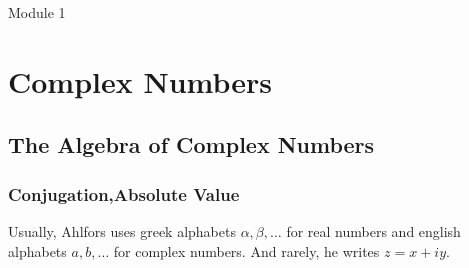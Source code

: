 

{\Large Module 1 }
\section{Complex Numbers}
\subsection{The Algebra of Complex Numbers}
\setcounter{subsubsection}{3}
\subsubsection{Conjugation,Absolute Value}
\begin{commentary}
	Usually, Ahlfors uses greek alphabets $\alpha,\beta,\dots$ for real numbers and english alphabets $a,b,\dots$ for complex numbers.
	And rarely, he writes $ z= x+iy$.
\end{commentary}
